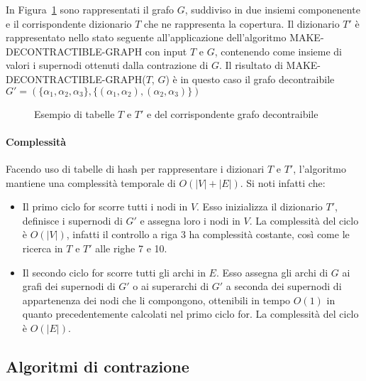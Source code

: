 

In Figura~\ref{fig:make_decontractible_graph_example} sono rappresentati il grafo $G$, suddiviso in due insiemi
componenente e il corrispondente dizionario $T$ che ne rappresenta la copertura. Il dizionario $T\mathcal{'}$ \`e
rappresentato nello stato seguente all'applicazione dell'algoritmo MAKE-DECONTRACTIBLE-GRAPH con input $T$ e $G$,
contenendo come insieme di valori i supernodi ottenuti dalla contrazione di $G$.
Il risultato di MAKE-DECONTRACTIBLE-GRAPH($T$, $G$) \`e in questo caso il grafo decontraibile
$G'=(\{\alpha_1, \alpha_2, \alpha_3\}, \{(\alpha_1, \alpha_2), (\alpha_2, \alpha_3)\})$

\begin{figure}[H]
    \centering
    
    \vspace{-30pt}
    \caption{Esempio di tabelle $T$ e $T'$ e del corrispondente grafo decontraibile}
    \label{fig:make_decontractible_graph_example}
\end{figure}

\paragraph{Complessità}
Facendo uso di tabelle di hash per rappresentare i dizionari $T$ e $T'$, l'algoritmo mantiene una complessit\`a
temporale di $O(|V| + |E|)$.
Si noti infatti che:
\begin{itemize}
    \item Il primo ciclo for scorre tutti i nodi in $V$.
    Esso inizializza il dizionario $T'$, definisce i supernodi di $G'$ e assegna loro i nodi in $V$.
    La complessità del ciclo è $O(|V|)$, infatti il controllo a riga 3 ha complessità costante,
    così come le ricerca in $T$ e $T'$ alle righe 7 e 10.
    \item Il secondo ciclo for scorre tutti gli archi in $E$.
    Esso assegna gli archi di $G$ ai grafi dei supernodi di $G'$ o ai superarchi di $G'$ a seconda dei supernodi
    di appartenenza dei nodi che li compongono, ottenibili in tempo $O(1)$ in quanto precedentemente calcolati nel
    primo ciclo for. La complessit\`a del ciclo \`e $O(|E|)$.
\end{itemize}

\subsection{Algoritmi di contrazione}\label{sec:algoritmi-di-contrazione}

